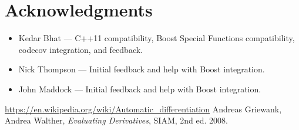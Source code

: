 \documentclass{article}
\begin{document}
\section{Acknowledgments}

\begin{itemize}
\item Kedar Bhat --- C++11 compatibility, Boost Special Functions compatibility, codecov integration, and feedback.
\item Nick Thompson --- Initial feedback and help with Boost integration.
\item John Maddock --- Initial feedback and help with Boost integration.
\end{itemize}

\begin{thebibliography}{1}
 \url{https://en.wikipedia.org/wiki/Automatic\_differentiation}
 Andreas Griewank, Andrea Walther, \textit{Evaluating Derivatives}, SIAM, 2nd ed. 2008.
\end{thebibliography}
\end{document}
